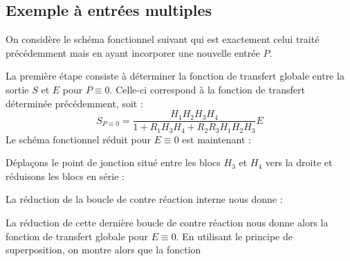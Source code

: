 \subsection{Exemple à entrées multiples}
On considère le schéma fonctionnel suivant qui est exactement celui traité
précédemment mais en ayant incorporer une nouvelle entrée $P$.
\begin{center}
    
\end{center}
La première étape consiste à déterminer la fonction de transfert globale entre
la sortie $S$ et $E$ pour $P\equiv0$.
Celle-ci correspond à la fonction de transfert déterminée précédemment, soit :
\[
     S_{P\equiv0}=\dfrac{H_1H_2H_3H_4}{1+R_1H_3H_4+R_2R_3H_1H_2H_3}E
\]
Le schéma fonctionnel réduit pour $E\equiv0$ est maintenant :
\begin{center}
    
\end{center}
Déplaçons le point de jonction situé entre les blocs $H_3$ et $H_4$ 
vers la droite et réduisons les blocs en série :
\begin{center}
    
\end{center}
La réduction de la boucle de contre réaction interne nous donne :
\begin{center}
    
\end{center}
La réduction de cette dernière boucle de contre réaction nous donne alors
la fonction de transfert globale pour $E\equiv0$. 
En utilisant le principe de superposition, on montre alors que la fonction 
